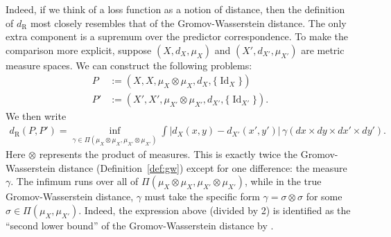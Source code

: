 \documentclass[twoside,11pt]{article}
\DeclareMathOperator{\id}{Id}
\newcommand{\dexp}[1][]{d_{\mathrm{R}#1}}
\begin{document}
    Indeed, if we think of a loss function as a notion of distance, then the definition of $\dexp$ most closely resembles that of the Gromov-Wasserstein distance. The only extra component is a supremum over the predictor correspondence. To make the comparison more explicit, suppose $(X,d_X,\mu_X)$ and $(X',d_{X'},\mu_{X'})$ are metric measure spaces. We can construct the following problems:
    \begin{align*}
    P & := (X,X,\mu_X\otimes \mu_X, d_X, \{\id_X\})\\
    P' & := (X',X',\mu_{X'}\otimes \mu_{X'}, d_{X'}, \{\id_{X'}\}).
    \end{align*}
    We then write
    \begin{align*}
    \dexp(P,P') = \inf_{\gamma \in \Pi(\mu_{X}\otimes \mu_{X},\mu_{X'}\otimes \mu_{X'})} \int \big|d_X(x,y) - d_{X'}(x',y')\big|\, \gamma(dx{\times} dy {\times} dx'{\times} dy').
    \end{align*}
    Here $\otimes$ represents the product of measures.
    This is exactly twice the Gromov-Wasserstein distance (Definition~\ref{def:gw}) except for one difference: the measure $\gamma$. The infimum runs over all of
    $\Pi(\mu_{X}\otimes \mu_{X},\mu_{X'}\otimes \mu_{X'})$, while in the true Gromov-Wasserstein distance, $\gamma$ must take the specific form $\gamma = \sigma\otimes \sigma$ for some $\sigma\in \Pi(\mu_X,\mu_{X'})$. Indeed, the expression above (divided by 2) is identified as the ``second lower bound'' of the Gromov-Wasserstein distance by \citet{memoli_GH_Distance}.
\end{document}
